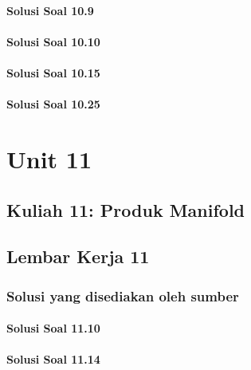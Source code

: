 \documentclass[11pt,a4paper,oneside]{book}
\begin{document}
\subsection*{Solusi Soal 10.9}

\subsection*{Solusi Soal 10.10}

\subsection*{Solusi Soal 10.15}

\subsection*{Solusi Soal 10.25}


\part{Unit 11}
\chapter[Kuliah 11]{Kuliah 11: Produk Manifold}


\chapter{Lembar Kerja 11}


\section*{Solusi yang disediakan oleh sumber}
\subsection*{Solusi Soal 11.10}

\subsection*{Solusi Soal 11.14}

\end{document}
